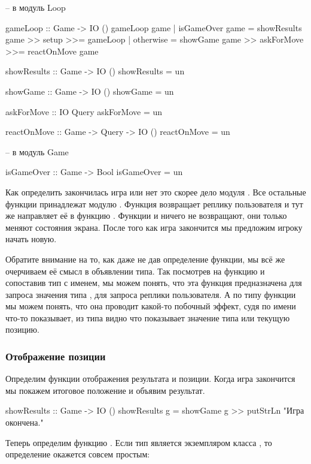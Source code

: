 \begin{code}
-- в модуль Loop

gameLoop :: Game -> IO ()
gameLoop game 
    | isGameOver game   = showResults game >> setup >>= gameLoop
    | otherwise         = showGame game >> askForMove >>= reactOnMove game


showResults :: Game -> IO ()
showResults = un

showGame :: Game -> IO ()
showGame = un

askForMove :: IO Query
askForMove = un

reactOnMove :: Game -> Query -> IO ()
reactOnMove = un

-- в модуль Game

isGameOver :: Game -> Bool
isGameOver = un
\end{code}

Как определить закончилась игра или нет это скорее дело
модуля . Все остальные функции принадлежат модулю .
Функция  возвращает реплику пользователя и 
тут же направляет её в функцию . 
Функции  и  ничего не возвращают,
они только меняют состояния экрана. После того как игра
закончится мы предложим игроку начать новую.

Обратите внимание на то, как даже не дав определение функции,
мы всё же очерчиваем её смысл в объявлении типа.
Так посмотрев на функцию  и сопоставив тип
с именем, мы можем понять, что эта функция предназначена
для запроса значения типа , для запроса реплики 
пользователя. А по типу функции  мы можем
понять, что она проводит какой-то побочный эффект, 
судя по имени что-то показывает, из типа видно что показывает
значение типа  или текущую позицию.

\subsubsection{Отображение позиции}

Определим функции отображения результата и позиции. Когда игра
закончится мы покажем итоговое положение и объявим результат.

\begin{code}
showResults :: Game -> IO ()
showResults g = showGame g >> putStrLn "Игра окончена."
\end{code}

Теперь определим функцию . Если тип
 является экземпляром класса , то
определение окажется совсем простым:

